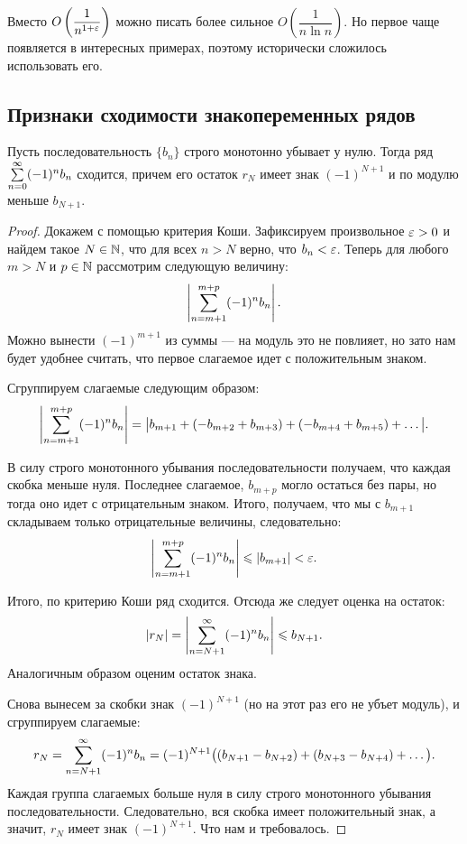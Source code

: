 \documentclass[a4paper, 12pt]{article}
\begin{document}
\begin{Comment}
Вместо $O\left(\dfrac{1}{n^{1+\varepsilon}} \right)$ можно писать более сильное $O\left(
\dfrac{1}{n\ln n} \right)$. Но первое чаще появляется в интересных примерах, поэтому исторически сложилось использовать его.
\end{Comment}

\subsection{Признаки сходимости знакопеременных рядов}
\begin{Test}
Пусть последовательность $\{b_n\}$ строго монотонно убывает у нулю. Тогда ряд $\sum\limits_{n=0}^{\infty}(-1)^nb_n$ сходится, причем его остаток $r_N$ имеет знак $(-1)^{N+1}$ и по модулю меньше $b_{N+1}$.
\end{Test}
\begin{proof}
Докажем с помощью критерия Коши. Зафиксируем произвольное $\varepsilon > 0$ и найдем такое $N \in \mathbb{N}$, что для всех $n > N$ верно, что $b_n < \varepsilon$. Теперь для любого $m > N$ и $p \in \mathbb{N}$ рассмотрим следующую величину:
$$
\left| \sum\limits_{n=m+1}^{m+p} (-1)^n b_n \right|.
$$  
Можно вынести $(-1)^{m+1}$ из суммы --- на модуль это не повлияет, но зато нам будет удобнее считать, что первое слагаемое идет с положительным знаком.

Сгруппируем слагаемые следующим образом:
$$
\left| \sum\limits_{n=m+1}^{m+p} (-1)^n b_n \right| = \big|b_{m+1} + (- b_{m+2} + b_{m+3}) + (- b_{m+4} + b_{m+5}) + \ldots\big|.
$$

В силу строго монотонного убывания последовательности получаем, что каждая скобка меньше нуля. Последнее слагаемое, $b_{m+p}$ могло остаться без пары, но тогда оно идет с отрицательным знаком. Итого, получаем, что мы с $b_{m+1}$ складываем только отрицательные величины, следовательно:
$$
\left| \sum\limits_{n=m+1}^{m+p} (-1)^n b_n \right| \leqslant |b_{m+1}| < \varepsilon.
$$

Итого, по критерию Коши ряд сходится. Отсюда же следует оценка на остаток: 
$$
|r_N| = \left| \sum\limits_{n=N+1}^{\infty}(-1)^n b_n  \right| \leqslant b_{N+1}.
$$
Аналогичным образом оценим остаток знака.

Снова вынесем за скобки знак $(-1)^{N+1}$ (но на этот раз его не убъет модуль), и сгруппируем слагаемые:
$$
r_N = \sum\limits_{n=N+1}^{\infty} (-1)^n b_n  = (-1)^{N+1}\big((b_{N+1} - b_{N+2}) + (b_{N+3} - b_{N+4}) + \ldots\big).$$
Каждая группа слагаемых больше нуля в силу строго монотонного убывания последовательности. Следовательно, вся скобка имеет положительный знак, а значит, $r_N$ имеет знак $(-1)^{N+1}$. Что нам и требовалось.
\end{proof}
\end{document}
